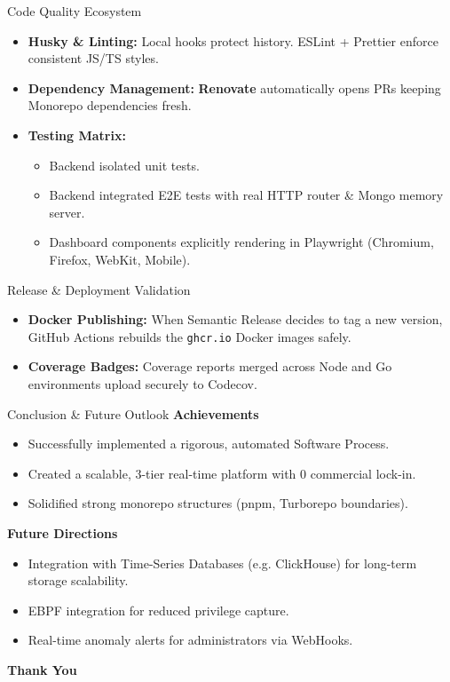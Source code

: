\documentclass[aspectratio=169]{beamer}
\begin{document}
\begin{frame}{Code Quality Ecosystem}
    \begin{itemize}
        \item \textbf{Husky \& Linting:} Local hooks protect history. ESLint + Prettier enforce consistent JS/TS styles.
        \item \textbf{Dependency Management:} \textbf{Renovate} automatically opens PRs keeping Monorepo dependencies fresh.
        \item \textbf{Testing Matrix:} 
        \begin{itemize}
            \item Backend isolated unit tests.
            \item Backend integrated E2E tests with real HTTP router \& Mongo memory server.
            \item Dashboard components explicitly rendering in Playwright (Chromium, Firefox, WebKit, Mobile).
        \end{itemize}
    \end{itemize}
\end{frame}

\begin{frame}{Release \& Deployment Validation}
    \begin{itemize}
        \item \textbf{Docker Publishing:} When Semantic Release decides to tag a new version, GitHub Actions rebuilds the \texttt{ghcr.io} Docker images safely.
        \item \textbf{Coverage Badges:} Coverage reports merged across Node and Go environments upload securely to Codecov.
    \end{itemize}
\end{frame}

\begin{frame}{Conclusion \& Future Outlook}
    \textbf{Achievements}
    \begin{itemize}
        \item Successfully implemented a rigorous, automated Software Process.
        \item Created a scalable, 3-tier real-time platform with 0 commercial lock-in.
        \item Solidified strong monorepo structures (pnpm, Turborepo boundaries).
    \end{itemize}
    \vspace{0.3cm}
    \textbf{Future Directions}
    \begin{itemize}
        \item Integration with Time-Series Databases (e.g. ClickHouse) for long-term storage scalability.
        \item EBPF integration for reduced privilege capture.
        \item Real-time anomaly alerts for administrators via WebHooks.
    \end{itemize}
\end{frame}

\begin{frame}
    \centering
    \Huge \textbf{Thank You}
    
\end{frame}
\end{document}
